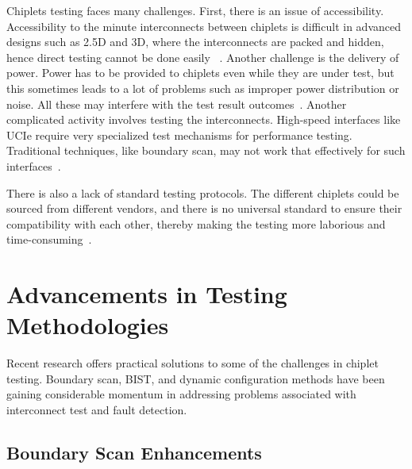 \documentclass[acmtog, 12pt]{acmart}
\begin{document}

Chiplets testing faces many challenges. First, there is an issue of accessibility. Accessibility to the minute interconnects between chiplets is difficult in advanced designs such as 2.5D and 3D, where the interconnects are packed and hidden, hence direct testing cannot be done easily ~\cite{10365967}.
Another challenge is the delivery of power. Power has to be provided to chiplets even while they are under test, but this sometimes leads to a lot of problems such as improper power distribution or noise. All these may interfere with the test result outcomes~\cite{9107636}.
Another complicated activity involves testing the interconnects. High-speed interfaces like UCIe require very specialized test mechanisms for performance testing. Traditional techniques, like boundary scan, may not work that effectively for such interfaces~\cite{10766679}.

There is also a lack of standard testing protocols. The different chiplets could be sourced from different vendors, and there is no universal standard to ensure their compatibility with each other, thereby making the testing more laborious and time-consuming~\cite{9107636}.


\section*{Advancements in Testing Methodologies}


Recent research offers practical solutions to some of the challenges in chiplet testing. Boundary scan, BIST, and dynamic configuration methods have been gaining considerable momentum in addressing problems associated with interconnect test and fault detection.


\subsection*{Boundary Scan Enhancements}
\end{document}

